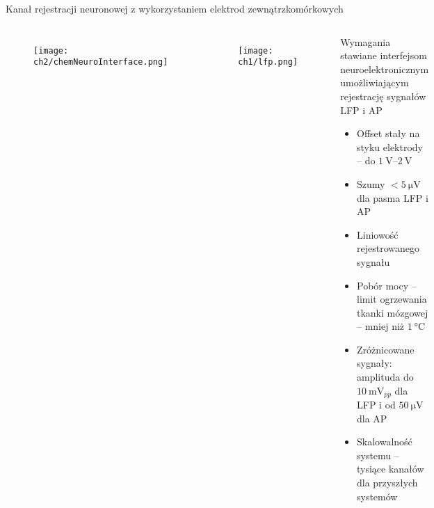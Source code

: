 \begin{frame}{Kanał rejestracji neuronowej z wykorzystaniem elektrod zewnątrzkomórkowych}
\vspace{-1em}
    \begin{columns}
        \begin{figure}[H]
            \centering
            \texttt{[image: ch2/chemNeuroInterface.png]} 

        \end{figure}
        \begin{figure}[H]
            \centering
            \texttt{[image: ch1/lfp.png]} 

          \end{figure}

        \begin{block}{Wymagania stawiane interfejsom neuroelektronicznym umożliwiającym rejestrację sygnałów LFP i AP}
            \begin{itemize}
                \item Offset stały na styku elektrody -- do $\SIrange{1}{2}{\volt}$ 
                \item Szumy $<\SI{5}{\micro\volt}$ dla pasma LFP i AP
                \item Liniowość rejestrowanego sygnału
                \item Pobór mocy -- limit ogrzewania tkanki mózgowej --  mniej niż  $\SI{1}{\degreeCelsius}$ 
                \item Zróżnicowane sygnały: amplituda do $\SI{10}{\milli\volt_{pp}}$ dla LFP i od  $\SI{50}{\micro\volt}$ dla AP
                \item Skalowalność systemu -- tysiące kanałów dla przyszłych systemów
            \end{itemize}
        \end{block}
 
    \end{columns}
\end{frame}


